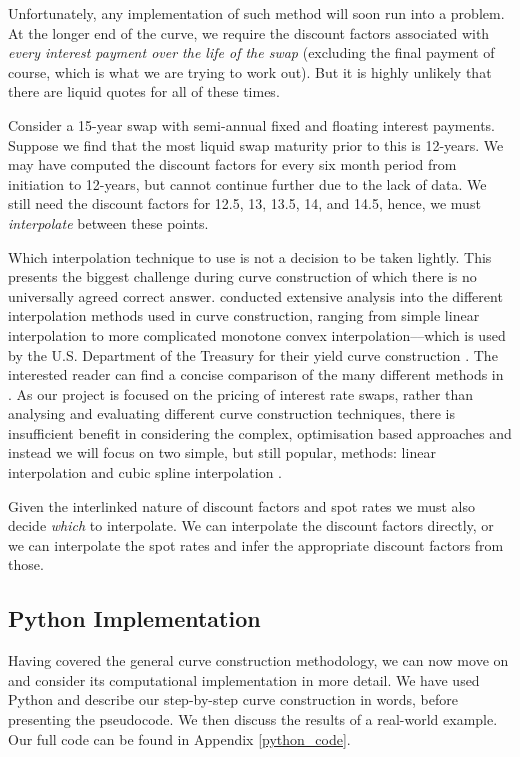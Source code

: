 Unfortunately, any implementation of such method will soon run into a problem. At the longer end of the curve, we require the discount factors associated with \textit{every interest payment over the life of the swap} (excluding the final payment of course, which is what we are trying to work out). But it is highly unlikely that there are liquid quotes for all of these times.

Consider a 15-year swap with semi-annual fixed and floating interest payments. Suppose we find that the most liquid swap maturity prior to this is 12-years. We may have computed the discount factors for every six month period from initiation to 12-years, but cannot continue further due to the lack of data. We still need the discount factors for 12.5, 13, 13.5, 14, and 14.5, hence, we must \textit{interpolate} between these points. 

Which interpolation technique to use is not a decision to be taken lightly. This presents the biggest challenge during curve construction of which there is no universally agreed correct answer. \cite{hagan2006interpolation} conducted extensive analysis into the different interpolation methods used in curve construction, ranging from simple linear interpolation to more complicated monotone convex interpolation––which is used by the U.S. Department of the Treasury for their yield curve construction \citep{us_treas}. The interested reader can find a concise comparison of the many different methods in \cite{hagan2008methods}. As our project is focused on the pricing of interest rate swaps, rather than analysing and evaluating different curve construction techniques, there is insufficient benefit in considering the complex, optimisation based approaches and instead we will focus on two simple, but still popular, methods: linear interpolation and cubic spline interpolation \citep{flavell2012swaps}. 

Given the interlinked nature of discount factors and spot rates we must also decide \textit{which} to interpolate. We can interpolate the discount factors directly, or we can interpolate the spot rates and infer the appropriate discount factors from those. 

\subsection{Python Implementation}
Having covered the general curve construction methodology, we can now move on and consider its computational implementation in more detail. We have used Python and describe our step-by-step curve construction in words, before presenting the pseudocode. We then discuss the results of a real-world example. Our full code can be found in Appendix \ref{python_code}.

